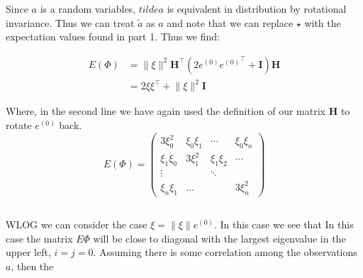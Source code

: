 \documentclass{article}
\begin{document}
Since $a$ is a random variables, $tilde{a}$ is equivalent in distribution by rotational invariance. Thus we can treat $\tilde{a}$ as $a$ and note that we can replace $\star$ with the expectation values found in part 1.
Thus we find: 

\begin{equation}
	\begin{split}
		E \left( \Phi  \right) &= \lVert\xi\rVert ^2 \boldsymbol{H}^\intercal \left(2e^{(0)}{e^{(0)}}^\intercal + \boldsymbol{I}   \right)\boldsymbol{H} \\
				       &= 2\xi\xi^\intercal + \lVert\xi\rVert^2\boldsymbol{I}
	\end{split}
\end{equation}

Where, in the second line we have again used the definition of our matrix $\boldsymbol{H}$ to rotate $e^{(0)}$ back. 
\begin{equation}
	E \left( \Phi \right) = \begin{pmatrix}
		3\xi_0^2 & \xi_0\xi_1 & \cdots  & \xi_0\xi_n \\
		\xi_1\xi_0 & 3\xi_1^2 & \xi_1\xi_2 & \cdots \\
		\vdots &  & \ddots & \\
		\xi_n\xi_1& \dots && 3\xi_n^2 
	\end{pmatrix}
\end{equation}

\subsection{}

WLOG we can consider the case $\xi  = \lVert \xi\rVert e^{(0)}$.
In this case we see that 
In this case the matrix $E\Phi$ will be close to diagonal with the largest eigenvalue in the upper left, $i=j=0$.
Assuming there is some correlation among the observations $a$, then the 
\end{document}
